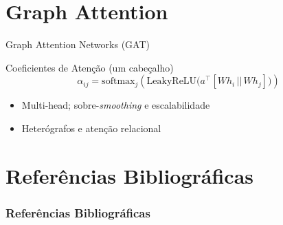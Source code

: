 \documentclass{beamer}
\begin{document}
\section{Graph Attention}
\begin{frame}{Graph Attention Networks (GAT)}
	\begin{block}{Coeficientes de Atenção (um cabeçalho)}
		\small
		\[
			\alpha_{ij}=\mathrm{softmax}_j\!\left(\mathrm{LeakyReLU}\!\big(a^\top[Wh_i \,||\, Wh_j]\big)\right)
		\]
	\end{block}
	\begin{itemize}
		\item Multi-head; sobre-\textit{smoothing} e escalabilidade
		\item Heterógrafos e atenção relacional
	\end{itemize}
\end{frame}

\section{Referências Bibliográficas}
\begin{frame}[allowframebreaks]
	\frametitle{Referências Bibliográficas}
	
	
\end{frame}
\end{document}

